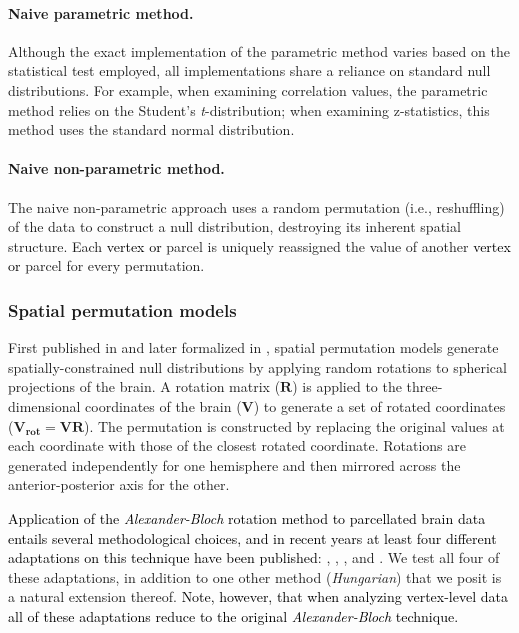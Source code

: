 \documentclass[12pt,aps,pra,reprint,showkeys]{revtex4-1}
\newcommand{\nimg}[1]{\textcolor{black}{{#1}}}
\begin{document}
\paragraph*{Naive parametric method.}

Although the exact implementation of the parametric method varies based on the statistical test employed, all implementations share a reliance on standard null distributions.
For example, when examining correlation values, the parametric method relies on the Student's \emph{t}-distribution; when examining z-statistics, this method uses the standard normal distribution.

\paragraph*{Naive non-parametric method.}

The naive non-parametric approach uses a random permutation (i.e., reshuffling) of the data to construct a null distribution, destroying its inherent spatial structure.
Each \nimg{vertex or} parcel is uniquely reassigned the value of another \nimg{vertex or} parcel for every permutation.

\subsubsection*{Spatial permutation models}

First published in \citet{alexander2013convergence} and later formalized in \citet{alexanderbloch2018neuroimage}, spatial permutation models generate spatially-constrained null distributions by applying random rotations to spherical projections of the brain.
A rotation matrix ($\mathbf{R}$) is applied to the three-dimensional coordinates of the brain ($\mathbf{V}$) to generate a set of rotated coordinates ($\mathbf{V_{rot}} = \mathbf{V} \mathbf{R}$).
The permutation is constructed by replacing the original values at each coordinate with those of the closest rotated coordinate.
Rotations are generated independently for one hemisphere and then mirrored across the anterior-posterior axis for the other.

\nimg{Application of the \textit{Alexander-Bloch} rotation method to parcellated brain data entails several methodological choices, and in recent years at least four different adaptations on this technique have been published}: \citet{vazquezrodriguez2019pnas}, \citet{vasa2018cercor}, \citet{baum2020pnas}, and \citet{cornblath2020commbio}.
We test all four of these adaptations, in addition to one other method (\emph{Hungarian}) that we posit is a natural extension thereof.
\nimg{Note, however, that when analyzing vertex-level data all of these adaptations reduce to the original \textit{Alexander-Bloch} technique.}
\end{document}
